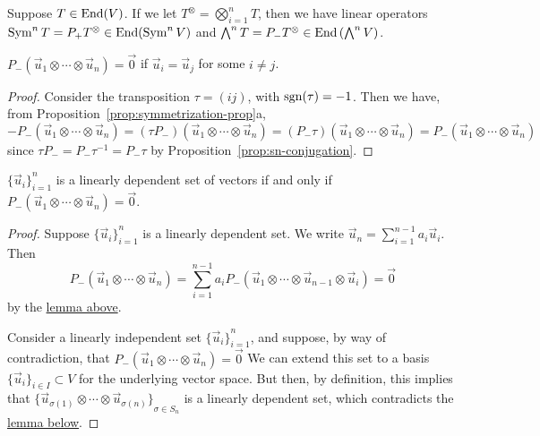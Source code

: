 \begin{definition}
    Suppose \(T \in \operatorname{End}(V)\).
    If we let \(T^\otimes = \bigotimes_{i=1}^n T\),
    then we have linear operators \(\operatorname{Sym}^n T = P_+ T^\otimes \in \operatorname{End}(\operatorname{Sym}^n V)\)
    and \(\Asym^n T = P_- T^\otimes \in \End\pqty{\Asym^n V}\).
\end{definition}

\begin{lemma}\label{lem:antisym-same-zero}
    \(P_-(\vec{u}_1 \otimes \cdots \otimes \vec{u}_n) = \vec{0}\)
    if \(\vec{u}_i = \vec{u}_j\) for some \(i \neq j\).
\end{lemma}
\begin{proof}
    Consider the transposition \(\tau = (ij)\), with \(\operatorname{sgn}(\tau) = -1\).
    Then we have, from Proposition~\ref{prop:symmetrization-prop}a,
    \begin{equation*}
        -P_-(\vec{u}_1 \otimes \cdots \otimes \vec{u}_n)
        = (\tau P_-)(\vec{u}_1 \otimes \cdots \otimes \vec{u}_n)
        = (P_- \tau)(\vec{u}_1 \otimes \cdots \otimes \vec{u}_n)
        = P_- (\vec{u}_1 \otimes \cdots \otimes \vec{u}_n)
    \end{equation*}
    since \(\tau P_- = P_- \tau^{-1} = P_- \tau\) by Proposition~\ref{prop:sn-conjugation}.
\end{proof}
\begin{theorem}\label{thm:antisym-lin-dep-zero}
    \({\{\vec{u}_i\}}_{i=1}^n\) is a linearly dependent set of vectors
    if and only if \(P_-(\vec{u}_1 \otimes \cdots \otimes \vec{u}_n) = \vec{0}\).
\end{theorem}
\begin{proof}
    Suppose \({\{\vec{u}_i\}}_{i=1}^n\) is a linearly dependent set.
    We write \(\vec{u}_n = \sum_{i=1}^{n-1} a_i\vec{u}_i\).
    Then
    \begin{equation*}
        P_-(\vec{u}_1 \otimes \cdots \otimes \vec{u}_n)
        = \sum_{i=1}^{n-1} a_i P_-(\vec{u}_1 \otimes \cdots \otimes \vec{u}_{n-1} \otimes \vec{u}_i)
        = \vec{0}
    \end{equation*}
    by the \hyperref[lem:antisym-same-zero]{lemma above}.
    
    Consider a linearly independent set \({\{\vec{u}_i\}}_{i=1}^n\),
    and suppose, by way of contradiction, that \(P_-(\vec{u}_1 \otimes \cdots \otimes \vec{u}_n) = \vec{0}\)
    We can extend this set to a basis \({\{\vec{u}_i\}}_{i \in I} \subset V\)
    for the underlying vector space.
    But then, by definition, this implies that
    \({\{\vec{u}_{\sigma(1)} \otimes \cdots \otimes \vec{u}_{\sigma(n)}\}}_{\sigma \in S_n}\)
    is a linearly dependent set,
    which contradicts the \hyperref[lem:tensor-n-basis]{lemma below}.
\end{proof}

